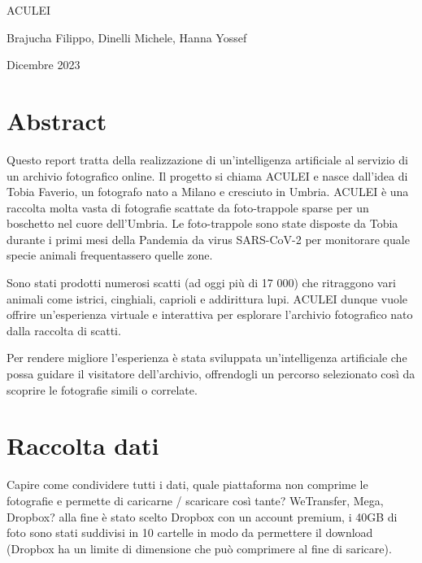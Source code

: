 \documentclass[12pt,a4paper,twoside]{article}
\begin{document}
\begin{titlepage}
    \centering
    \vspace*{\fill}

    \vspace*{0.5cm}
    
    \huge ACULEI
    
    \vspace*{1cm}
    \small Brajucha Filippo, Dinelli Michele, Hanna Yossef
    
    \vspace*{0.5cm}
    \small Dicembre 2023
    
    \vspace*{\fill}
\end{titlepage}


\newpage

\section*{Abstract}

Questo report tratta della realizzazione di un'intelligenza artificiale al servizio di un archivio fotografico 
online. Il progetto si chiama ACULEI e nasce dall'idea di Tobia Faverio, un fotografo nato a Milano e cresciuto 
in Umbria. ACULEI è una raccolta molta vasta di fotografie scattate da foto-trappole sparse per un boschetto nel 
cuore dell'Umbria. Le foto-trappole sono state disposte da Tobia durante i primi mesi della Pandemia da virus 
SARS-CoV-2 per monitorare quale specie animali frequentassero quelle zone. 

Sono stati prodotti numerosi scatti (ad oggi più di 17 000) che ritraggono vari animali come istrici, cinghiali, 
caprioli e addirittura lupi. ACULEI dunque vuole offrire un'esperienza virtuale e interattiva per esplorare 
l'archivio fotografico nato dalla raccolta di scatti. 

Per rendere migliore l'esperienza è stata sviluppata un'intelligenza artificiale che possa guidare il visitatore 
dell'archivio, offrendogli un percorso selezionato così da scoprire le fotografie simili o correlate.
 
\newpage

\tableofcontents

\newpage

\section{Raccolta dati}
Capire come condividere tutti i dati, quale piattaforma non comprime le fotografie e permette di caricarne /
scaricare così tante? WeTransfer, Mega, Dropbox? alla fine è stato scelto Dropbox con un account premium, i 
40GB di foto sono stati suddivisi in 10 cartelle in modo da permettere il download (Dropbox ha un limite di 
dimensione che può comprimere al fine di saricare).
\end{document}
